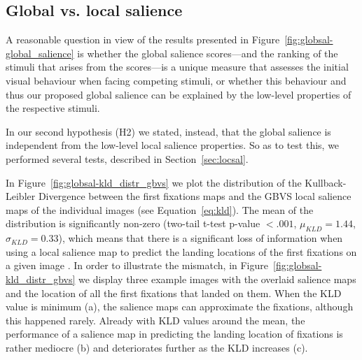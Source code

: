{\subsection{Global vs. local salience}
\label{sec:results-local_salience}

A reasonable question in view of the results presented in Figure~\ref{fig:globsal-global_salience} is whether the global salience scores---and the ranking of the stimuli that arises from the scores---is a unique measure that assesses the initial visual behaviour when facing competing stimuli, or whether this behaviour and thus our proposed global salience can be explained by the low-level properties of the respective stimuli.

In our second hypothesis (H2) we stated, instead, that the global salience is independent from the low-level local salience properties. So as to test this, we performed several tests, described in Section~\ref{sec:locsal}.

In Figure~\ref{fig:globsal-kld_distr_gbvs} we plot the distribution of the Kullback-Leibler Divergence between the first fixations maps and the GBVS local salience maps of the individual images (see Equation~\ref{eq:kld}). The mean of the distribution is significantly non-zero (two-tail t-test p-value $< .001$, $\mu_{KLD} = 1.44$, $\sigma_{KLD} = 0.33$), which means that there is a significant loss of information when using a local salience map to predict the landing locations of the first fixations on a given image \citep{riche2013saliency}. In order to illustrate the mismatch, in Figure~\ref{fig:globsal-kld_distr_gbvs} we display three example images with the overlaid salience maps and the location of all the first fixations that landed on them. When the KLD value is minimum (a), the salience maps can approximate the fixations, although this happened rarely. Already with KLD values around the mean, the performance of a salience map in predicting the landing location of fixations is rather mediocre (b) and deteriorates further as the KLD increases (c).

}
